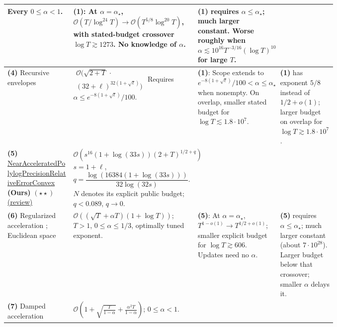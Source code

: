 \begin{table}[tp]
\begin{threeparttable}
\begin{tabularx}{\linewidth}{@{}>{\raggedright\arraybackslash}p{0.20\linewidth}>{\raggedright\arraybackslash}p{0.32\linewidth}>{\raggedright\arraybackslash}p{0.25\linewidth}>{\raggedright\arraybackslash}X@{}}
Every $0\le\alpha<1$.
& \textbf{(1)}: At $\alpha=\alpha_\star$, $\mathcal{O}(T/\log^{24}T)\to\mathcal{O}(T^{5/8}\log^{20}T)$, with stated-budget crossover $\log T\gtrsim1273$. No knowledge of $\alpha$.
& \textbf{(1)} requires $\alpha\le\alpha_\star$; much larger constant. Worse roughly when $\alpha\lesssim10^{16}T^{-3/16}(\log T)^{10}$ for large $T$. \\
\midrule
\textbf{(4)} Recursive envelopes \citep{srscRecursiveRepository}
& $\begin{gathered}\mathcal{O}\bigl(\sqrt{2+T}\,\cdot{}\\ (32+\ell)^{32(1+\sqrt\ell)}\bigr)\end{gathered}$\newline
Requires $\alpha\le e^{-8(1+\sqrt\ell)}/100$.
& \textbf{(1)}: Scope extends to $e^{-8(1+\sqrt\ell)}/100<\alpha\le\alpha_\star$ when nonempty. On overlap, smaller stated budget for $\log T\lesssim1.8\cdot10^7$.
& \textbf{(1)} has exponent $5/8$ instead of $1/2+o(1)$; larger budget on overlap for $\log T\gtrsim1.8\cdot10^7$. \\
\midrule
\textbf{(5)} \href{https://github.com/k3nfalt/longtails/blob/main/LongTails/Theorems/NearAcceleratedPolylogPrecisionRelativeErrorConvex.lean}{Near\allowbreak Accelerated\allowbreak Polylog\allowbreak Precision\allowbreak Relative\allowbreak Error\allowbreak Convex} \textbf{(Ours)} $(\star\star)$ \href{https://github.com/k3nfalt/longtails/blob/main/scripts/reviews/NearAcceleratedPolylogPrecisionRelativeErrorConvex.md}{(review)}
& $\mathcal{O}\!\left(s^{16}(1+\log(33s))(2+T)^{1/2+q}\right)$\newline
$s=1+\ell$, $q=\dfrac{\log(16384(1+\log(33s)))}{32\log(32s)}$.\newline
$N$ denotes its explicit public budget; $q<0.089$, $q\to0$. & & \\
\midrule[1.2pt]
\textbf{(6)} Regularized acceleration \citep[Theorem~7.2]{pgVasinGasnikov2026v1}; Euclidean space
& $\mathcal{O}((\sqrt T+\alpha T)(1+\log T))$; $T>1$, $0\le\alpha\le1/3$, optimally tuned exponent.
& \textbf{(5)}: At $\alpha=\alpha_\star$, $T^{1-o(1)}\to T^{1/2+o(1)}$; smaller explicit budget for $\log T\gtrsim606$. Updates need no $\alpha$.
& \textbf{(5)} requires $\alpha\le\alpha_\star$; much larger constant (about $7\cdot10^{28}$). Larger budget below that crossover; smaller $\alpha$ delays it. \\
\midrule
\textbf{(7)} Damped acceleration \citep{srscDampedRepository}
& $\mathcal{O}\!\left(1+\sqrt{\frac{T}{1-\alpha}}+\frac{\alpha^2T}{1-\alpha}\right)$; $0\le\alpha<1$.

\end{tabularx}
\end{threeparttable}
\end{table}
